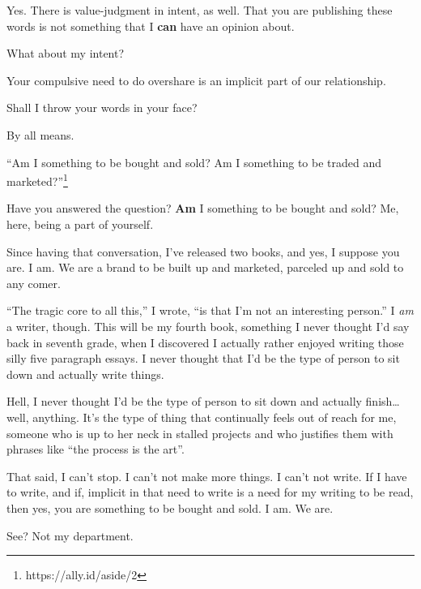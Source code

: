 \begin{paracol}{2}
\begin{leftcolumn}
\begin{ally}
Yes. There is value-judgment in intent, as well. That you are publishing these words is not something that I \textbf{can} have an opinion about.
\end{ally}
What about my intent?

\begin{ally}
Your compulsive need to do overshare is an implicit part of our relationship.
\end{ally}
Shall I throw your words in your face?

\begin{ally}
By all means.
\end{ally}
``Am I something to be bought and sold? Am I something to be traded and marketed?''\footnote{https://ally.id/aside/2}

\begin{ally}
Have you answered the question? \textbf{Am} I something to be bought and sold? Me, here, being a part of yourself.
\end{ally}
Since having that conversation, I've released two books, and yes, I suppose you are. I am. We are a brand to be built up and marketed, parceled up and sold to any comer.

``The tragic core to all this,'' I wrote, ``is that I'm not an interesting person.'' I \emph{am} a writer, though. This will be my fourth book, something I never thought I'd say back in seventh grade, when I discovered I actually rather enjoyed writing those silly five paragraph essays. I never thought that I'd be the type of person to sit down and actually write things.

Hell, I never thought I'd be the type of person to sit down and actually finish\ldots{}well, anything. It's the type of thing that continually feels out of reach for me, someone who is up to her neck in stalled projects and who justifies them with phrases like ``the process is the art''.

That said, I can't stop. I can't not make more things. I can't not write. If I have to write, and if, implicit in that need to write is a need for my writing to be read, then yes, you are something to be bought and sold. I am. We are.

\begin{ally}
See? Not my department.
\end{ally}
  \end{leftcolumn}
\end{paracol}
